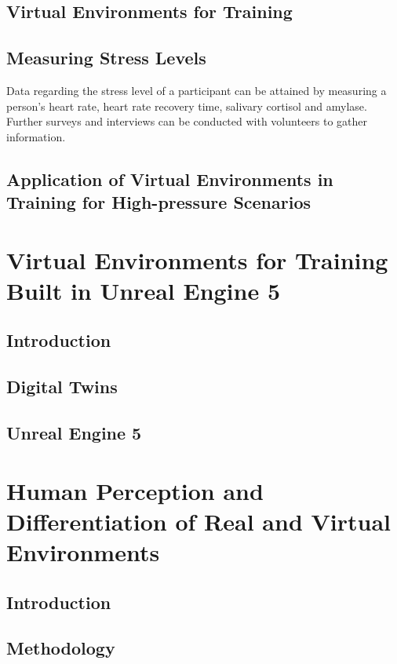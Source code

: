 \documentclass[12pt]{article}
\begin{document}
\subsection{Virtual Environments for Training}

\subsection{Measuring Stress Levels}

Data regarding the stress level of a participant can be attained by measuring a person's heart rate, heart rate recovery time, salivary cortisol and amylase. Further surveys and interviews can be conducted with volunteers to gather information. \cite{liu2018impact}

\subsection{Application of Virtual Environments in Training for High-pressure Scenarios}

\section{Virtual Environments for Training Built in Unreal Engine 5}

\subsection{Introduction}

\subsection{Digital Twins}

\subsection{Unreal Engine 5}

\section{Human Perception and Differentiation of Real and Virtual Environments}

\subsection{Introduction}

\subsection{Methodology}
\end{document}
